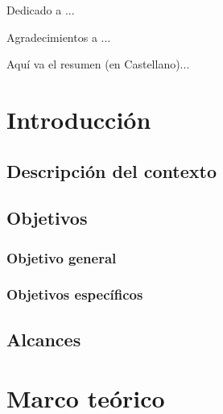 \documentclass{iccmemoria}
\author{Jorge Gómez Valderrama}
\date{mes, año}
\begin{document}
\maketitle

\begin{dedicatory}
Dedicado a ...
\end{dedicatory}

\begin{acknowledgment}
Agradecimientos a ...
\end{acknowledgment}

\tableofcontents
\listoffigures
\listoftables

\begin{resumen}
Aquí va el resumen (en Castellano)... 
\end{resumen}


\chapter{Introducción}

\section{Descripción del contexto}

\section{Objetivos}

\subsection{Objetivo general}

\subsection{Objetivos específicos}

\section{Alcances}


\chapter{Marco teórico}
\end{document}
